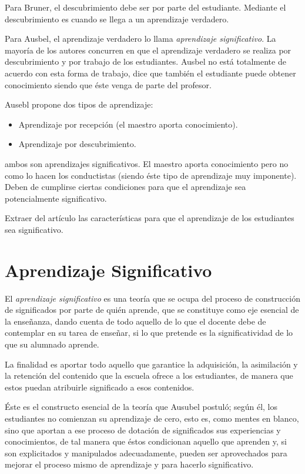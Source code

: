 \documentclass[12pt]{report}
\newcounter{it}
\theoremstyle{largebreak}
\begin{document}
    Para Bruner, el descubrimiento debe ser por parte del estudiante. Mediante el descubrimiento es cuando se llega a un aprendizaje verdadero.

    Para Ausbel, el aprendizaje verdadero lo llama \textit{aprendizaje significativo}. La mayoría de los autores concurren en que el aprendizaje verdadero se realiza por descubrimiento y por trabajo de los estudiantes. Ausbel no está totalmente de acuerdo con esta forma de trabajo, dice que también el estudiante puede obtener conocimiento siendo que éste venga de parte del profesor.

    Ausebl propone dos tipos de aprendizaje:
    \begin{itemize}
        \item Aprendizaje por recepción (el maestro aporta conocimiento).
        \item Aprendizaje por descubrimiento.
    \end{itemize}
    ambos son aprendizajes significativos. El maestro aporta conocimiento pero no como lo hacen los conductistas (siendo éste tipo de aprendizaje muy imponente). Deben de cumplirse ciertas condiciones para que el aprendizaje sea potencialmente significativo.

    \begin{excer}
        Extraer del artículo las características para que el aprendizaje de los estudiantes sea significativo.
    \end{excer}

    \section{Aprendizaje Significativo}

    El \textit{aprendizaje significativo} es una teoría que se ocupa del proceso de construcción de significados por parte de quién aprende, que se constituye como eje esencial de la enseñanza, dando cuenta de todo aquello de lo que el docente debe de contemplar en su tarea de enseñar, si lo que pretende es la significatividad de lo que su alumnado aprende.
    
    La finalidad es aportar todo aquello que garantice la adquisición, la asimilación y la retención del contenido que la escuela ofrece a los estudiantes, de manera que estos puedan atribuirle significado a esos contenidos.

    Éste es el constructo esencial de la teoría que Ausubel postuló; según él, los
    estudiantes no comienzan su aprendizaje de cero, esto es, como mentes en blanco,
    sino que aportan a ese proceso de dotación de significados sus experiencias y
    conocimientos, de tal manera que éstos condicionan aquello que aprenden y, si son
    explicitados y manipulados adecuadamente, pueden ser aprovechados para mejorar el
    proceso mismo de aprendizaje y para hacerlo significativo. 
\end{document}
